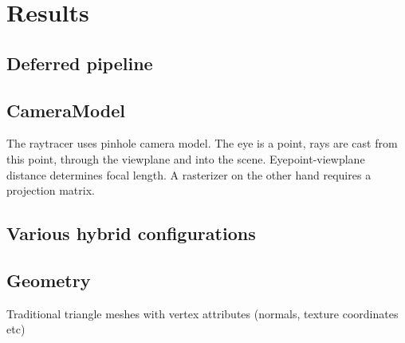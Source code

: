 \section{Results}


\subsection{Deferred pipeline}

\subsection{CameraModel}
The raytracer uses pinhole camera model. The eye is a point, rays are cast from this point, through the viewplane and into the scene. Eyepoint-viewplane distance determines focal length. A rasterizer on the other hand requires a projection matrix.

\subsection{Various hybrid configurations}

\subsection{Geometry}

Traditional triangle meshes with vertex attributes (normals, texture coordinates etc)



